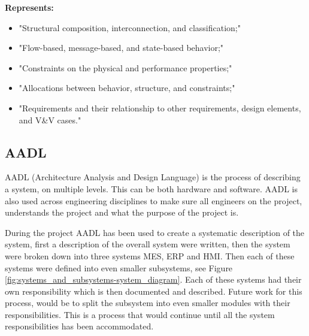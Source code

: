 \textbf{Represents:}
\begin{itemize}
    \item "Structural composition, interconnection, and classification;" \cite{EYKlecture4}
    \item "Flow-based, message-based, and state-based behavior;" \cite{EYKlecture4}
    \item "Constraints on the physical and performance properties;" \cite{EYKlecture4}
    \item "Allocations between behavior, structure, and constraints;" \cite{EYKlecture4}
    \item "Requirements and their relationship to other requirements, design elements, and V\&V cases." \cite{EYKlecture4}
\end{itemize}



\subsection{AADL} %
AADL (Architecture Analysis and Design Language) is the process of describing a system, on multiple levels. This can be both hardware and software. AADL is also used across engineering disciplines to make sure all engineers on the project, understands the project and what the purpose of the project is.

During the project AADL has been used to create a systematic description of the system, first a description of the overall system were written, then the system were broken down into three systems MES, ERP and HMI. Then each of these systems were defined into even smaller subsystems, see Figure \ref{fig:systems_and_subsystems-system_diagram}. Each of these systems had their own responsibility which is then documented and described. Future work for this process, would be to split the subsystem into even smaller modules with their responsibilities. This is a process that would continue until all the system responsibilities has been accommodated.


